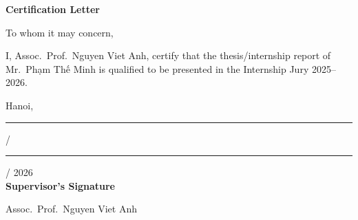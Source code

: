 \clearpage
\thispagestyle{empty}

\begin{center}
    {\Large\bfseries Certification Letter\par}
\end{center}

\vspace{1.5cm}

\begin{center}
To whom it may concern,
\end{center}

\vspace{0.8cm}

I, Assoc.\ Prof.\ Nguyen Viet Anh, certify that the thesis/internship report of Mr.\ Phạm Thế Minh is qualified to be presented in the Internship Jury 2025--2026.

\vspace{3.5cm}

\begin{flushright}
Hanoi, \rule{0.9cm}{0.4pt} / \rule{0.9cm}{0.4pt} / 2026\\[0.4cm]
\textbf{Supervisor's Signature}

\vspace{2.8cm}

Assoc.\ Prof.\ Nguyen Viet Anh
\end{flushright}

\clearpage
